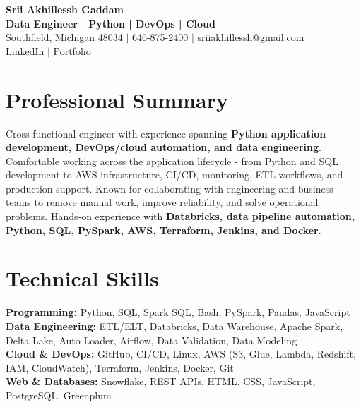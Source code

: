 \documentclass[letterpaper,10pt]{article}
\begin{document}
\fontsize{9.35pt}{10.45pt}\selectfont

\begin{center}
    {\LARGE \textbf{Srii Akhillessh Gaddam}} \\[-1pt]
    \textbf{Data Engineer | Python | DevOps | Cloud} \\[2pt]
    Southfield, Michigan 48034 $|$
    \href{tel:6468752400}{646-875-2400} $|$
    \href{mailto:sriiakhillessh@gmail.com}{sriiakhillessh@gmail.com} \\[1pt]
    \href{https://www.linkedin.com/in/srii-akhiilessh-gaddam-b48668191/}{LinkedIn} $|$
    \href{https://sriiakhillesshg.github.io/portfolio/}{Portfolio}
\end{center}
\vspace{-8pt}

\section{Professional Summary}
\small{Cross-functional engineer with experience spanning \textbf{Python application development, DevOps/cloud automation, and data engineering}. Comfortable working across the application lifecycle - from Python and SQL development to AWS infrastructure, CI/CD, monitoring, ETL workflows, and production support. Known for collaborating with engineering and business teams to remove manual work, improve reliability, and solve operational problems. Hands-on experience with \textbf{Databricks, data pipeline automation, Python, SQL, PySpark, AWS, Terraform, Jenkins, and Docker}.}

\section{Technical Skills}
\small{
\textbf{Programming:} Python, SQL, Spark SQL, Bash, PySpark, Pandas, JavaScript \\
\textbf{Data Engineering:} ETL/ELT, Databricks, Data Warehouse, Apache Spark, Delta Lake, Auto Loader, Airflow, Data Validation, Data Modeling \\
\textbf{Cloud \& DevOps:} GitHub, CI/CD, Linux, AWS (S3, Glue, Lambda, Redshift, IAM, CloudWatch), Terraform, Jenkins, Docker, Git \\
\textbf{Web \& Databases:} Snowflake, REST APIs, HTML, CSS, JavaScript, PostgreSQL, Greenplum
}
\end{document}
